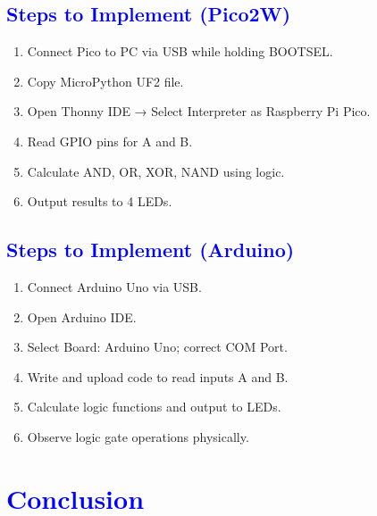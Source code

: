 \documentclass[twocolumn]{article}
\begin{document}
\subsection*{\textcolor{blue}{Steps to Implement (Pico2W)}}

\begin{enumerate}
    \item Connect Pico to PC via USB while holding BOOTSEL.
    \item Copy MicroPython UF2 file.
    \item Open Thonny IDE → Select Interpreter as Raspberry Pi Pico.
    \item Read GPIO pins for A and B.
    \item Calculate AND, OR, XOR, NAND using logic.
    \item Output results to 4 LEDs.
\end{enumerate}

\subsection*{\textcolor{blue}{Steps to Implement (Arduino)}}

\begin{enumerate}
    \item Connect Arduino Uno via USB.
    \item Open Arduino IDE.
    \item Select Board: Arduino Uno; correct COM Port.
    \item Write and upload code to read inputs A and B.
    \item Calculate logic functions and output to LEDs.
    \item Observe logic gate operations physically.
\end{enumerate}

\section*{\textcolor{blue}{Conclusion}}
\end{document}
